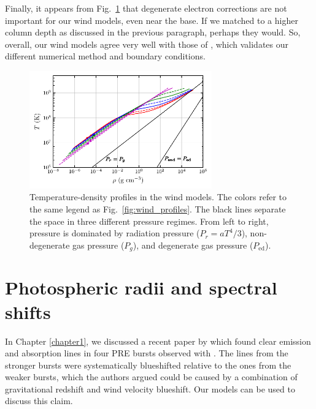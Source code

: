 \documentclass[../main.tex]{subfiles}
\begin{document}
Finally, it appears from Fig.~\ref{fig:wind_rho_T} that degenerate electron corrections are not important for our wind models, even near the base. If we matched to a higher column depth as discussed in the previous paragraph, perhaps they would. So, overall, our wind models agree very well with those of \citet{Paczynski1986b}, which validates our different numerical method and boundary conditions.


\begin{figure}[htb!]
    \centering
    \includegraphics[width=0.7\textwidth]{figures/wind_rho_T.pdf}
    \caption[Wind temperature-density profiles]{Temperature-density profiles in the wind models. The colors refer to the same legend as Fig.~\ref{fig:wind_profiles}. The black lines separate the space in three different pressure regimes. From left to right, pressure is dominated by radiation pressure ($P_r=aT^4/3$), non-degenerate gas pressure ($P_g$), and degenerate gas pressure ($P_\text{ed}$).}
    \label{fig:wind_rho_T}
\end{figure}

\section{Photospheric radii and spectral shifts}\label{sec:wind_photospheres_spectralshifts}
In Chapter \ref{chapter1}, we discussed a recent paper by \citet{Strohmayer2019} which found clear emission and absorption lines in four PRE bursts observed with {\Nicer}. The lines from the stronger bursts were systematically blueshifted relative to the ones from the weaker bursts, which the authors argued could be caused by a combination of gravitational redshift and wind velocity blueshift. Our models can be used to discuss this claim.
\end{document}
